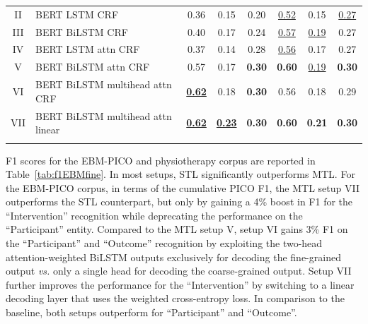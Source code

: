 \documentclass[runningheads]{llncs}
\begin{document}
\begin{table}[h!]
\begin{tabular}{clccc|ccc}
        II & BERT LSTM CRF & 0.36 & 0.15 & 0.20 & \underline{0.52} & 0.15 & \underline{0.27} \\
        III & BERT BiLSTM CRF & 0.40 & 0.17 & 0.24 & \underline{0.57} & \underline{0.19} & 0.27 \\
        IV & BERT LSTM attn CRF & 0.37 & 0.14 & 0.28 & \underline{0.56} & 0.17 & 0.27 \\
        V & BERT BiLSTM attn CRF & 0.57 & 0.17 & \textbf{0.30} & \textbf{0.60} & \underline{0.19} & \textbf{0.30} \\
        VI & BERT BiLSTM multihead attn CRF & \underline{\textbf{0.62}} & 0.18 & \textbf{0.30} & 0.56 & 0.18 & 0.29 \\
        VII & BERT BiLSTM multihead attn linear & \underline{\textbf{0.62}} & \underline{\textbf{0.23}} & \textbf{0.30} & \textbf{0.60} & \textbf{0.21} & \textbf{0.30} \\
        \Xhline{1pt}
    \end{tabular}
\end{table}
\endgroup
%
F1 scores for the EBM-PICO and physiotherapy corpus are reported in Table~\ref{tab:f1EBMfine}.
In most setups, STL significantly outperforms MTL. 
For the EBM-PICO corpus, in terms of the cumulative PICO F1, the MTL setup VII outperforms the STL counterpart, but only by gaining a 4\% boost in F1 for the ``Intervention'' recognition while deprecating the performance on the ``Participant'' entity.
Compared to the MTL setup V, setup VI gains 3\% F1 on the ``Participant'' and ``Outcome'' recognition by exploiting the two-head attention-weighted BiLSTM outputs exclusively for decoding the fine-grained output \textit{vs.} only a single head for decoding the coarse-grained output.
Setup VII further improves the performance for the ``Intervention'' by switching to a linear decoding layer that uses the weighted cross-entropy loss.
In comparison to the baseline, both setups outperform for ``Participant'' and ``Outcome''.
\end{document}
